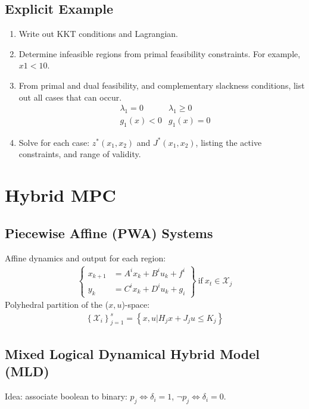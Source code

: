 \documentclass[landscape,a4paper,8pt]{scrartcl}
\renewcommand{\iff}{\Leftrightarrow}
\newcommand{\mc}[1]{\mathcal{#1}}
\newcommand{\Mg}[1]{\begin{Bmatrix}#1\end{Bmatrix}} %
\begin{document}
\begin{multicols*}{3}
\subsection{Explicit Example}
\begin{enumerate}
 \itemsep0em
 \item Write out KKT conditions and Lagrangian.
 \item Determine infeasible regions from primal feasibility constraints. For example, $x1 < 10$.
 \item From primal and dual feasibility, and complementary slackness conditions, list out all cases that can occur.
 \begin{align*}
  &\lambda_1 = 0 &\lambda_1 \geq 0\\
  & g_1(x) < 0 &g_1(x) = 0
 \end{align*}
 \item Solve for each case: $z^*(x_1, x_2)$ and $J^*(x_1, x_2)$, listing the active constraints, and range of validity.
\end{enumerate}

\section{Hybrid MPC}
\subsection{Piecewise Affine (PWA) Systems}
Affine dynamics and output for each region:
\begin{align*}
\Mg{x_{k+1} &= A^i x_k + B^i u_k + f^i \\ y_k &= C^i x_k + D^i u_k + g_i} \mathrm{~if~} x_t \in \mc{X}_j
\end{align*}
Polyhedral partition of the ($x,u$)-space:
\begin{align*}
\left\{\mc{X}_i\right\}_{j=1}^s = \left\{x,u| H_j x + J_j u \leq K_j\right\}
\end{align*}

\subsection{Mixed Logical Dynamical Hybrid Model (MLD)}
Idea: associate boolean to binary: $ p_j \iff \delta_i = 1$, $\neg p_j \iff \delta_i =0$.

\end{multicols*}
\end{document}

